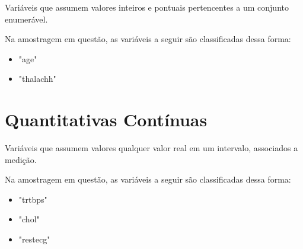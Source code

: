     Variáveis que assumem valores inteiros e pontuais pertencentes a um conjunto enumerável. 

    Na amostragem em questão, as variáveis a seguir são classificadas dessa forma: 

    \begin{itemize}
        \item "age"
        \item "thalachh"
    \end{itemize}

    \section{Quantitativas Contínuas}

    Variáveis que assumem valores qualquer valor real em um intervalo, associados a medição. 

    Na amostragem em questão, as variáveis a seguir são classificadas dessa forma: 

    \begin{itemize}
        \item "trtbps"
        \item "chol"
        \item "restecg"
    \end{itemize}

    \nocite{classificacao}